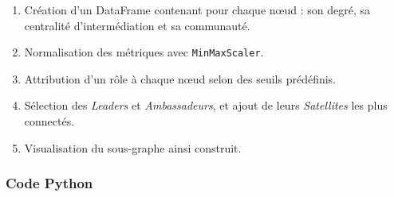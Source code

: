\documentclass[a4paper, 12pt, twoside]{article}
\begin{document}
\begin{enumerate}
    \item Création d’un DataFrame contenant pour chaque nœud : son degré, sa centralité d’intermédiation et sa communauté.
    \item Normalisation des métriques avec \texttt{MinMaxScaler}.
    \item Attribution d’un rôle à chaque nœud selon des seuils prédéfinis.
    \item Sélection des \textit{Leaders} et \textit{Ambassadeurs}, et ajout de leurs \textit{Satellites} les plus connectés.
    \item Visualisation du sous-graphe ainsi construit.
\end{enumerate}

\subsubsection*{Code Python}
\end{document}
